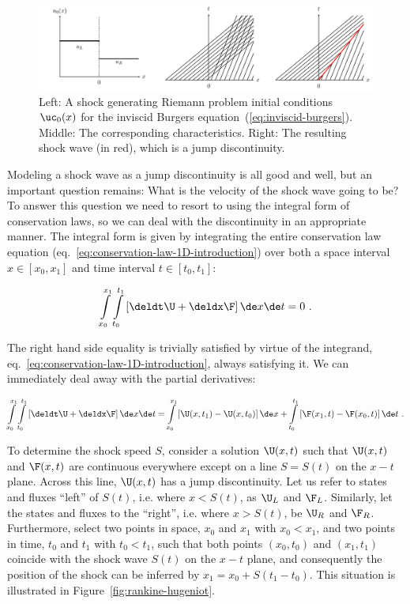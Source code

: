 \begin{figure}[H]
    \centering
    \includegraphics[width=\linewidth]{./figures/FV/burgers_riemann_shock.pdf}%
    \caption[Characteristics and shock wave for the Riemann problem of Burgers equation]{
    Left: A shock generating Riemann problem initial conditions $\uc_0(x)$ for the inviscid Burgers
equation~(\ref{eq:inviscid-burgers}). Middle: The corresponding characteristics. Right: The
resulting shock wave (in red), which is a jump discontinuity.
}
    \label{fig:burgers-riemann-shock}
\end{figure}

Modeling a shock wave as a jump discontinuity is all good and well, but an important question
remains: What is the velocity of the shock wave going to be? To answer this question we need to
resort to using the integral form of conservation laws, so we can deal with the discontinuity in an
appropriate manner. The integral form is given by integrating the entire conservation law equation
(eq.~\ref{eq:conservation-law-1D-introduction}) over both a space interval $x \in [x_0, x_1]$ and
time interval $t \in [t_0, t_1]$:

\begin{align}
    \int\limits_{x_0}^{x_1} \int\limits_{t_0}^{t_1} \left[\deldt \U + \deldx \F \right] \de x \de t
= 0 \ .
\end{align}

The right hand side equality is trivially satisfied by virtue of the integrand,
eq.~\ref{eq:conservation-law-1D-introduction}, always satisfying it. We can immediately deal
away with the partial derivatives:

\begin{align}
    \int\limits_{x_0}^{x_1} \int\limits_{t_0}^{t_1} \left[\deldt \U + \deldx \F \right] \de x \de t
=
    \int\limits_{x_0}^{x_1} \left[ \U(x, t_1) - \U(x, t_0) \right] \de x +
    \int\limits_{t_0}^{t_1} \left[ \F(x_1, t) - \F(x_0, t) \right] \de t \ .
    \label{eq:rankine-hugeniot-integral}
\end{align}

To determine the shock speed $S$, consider a solution $\U(x,t)$ such that $\U(x,t)$ and $\F(x,t)$
are continuous everywhere except on a line $S = S(t)$ on the $x-t$ plane. Across this line,
$\U(x,t)$ has a jump discontinuity. Let us refer to states and fluxes ``left'' of $S(t)$, i.e.
where $x < S(t)$, as $\U_L$ and $\F_L$. Similarly, let the states and fluxes to the ``right'', i.e.
where $x > S(t)$, be $\U_R$ and $\F_R$. Furthermore, select two points in space, $x_0$ and $x_1$
with $x_0 < x_1$, and two points in time, $t_0$ and $t_1$ with $t_0 < t_1$, such that both points
$(x_0, t_0)$ and $(x_1, t_1)$ coincide with the shock wave $S(t)$ on the $x-t$ plane, and
consequently the position of the shock can be inferred by $x_1 = x_0 + S (t_1 - t_0)$. This
situation is illustrated in Figure~\ref{fig:rankine-hugeniot}.


